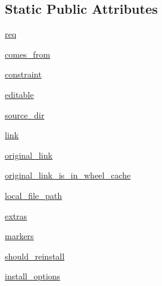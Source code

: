 \subsection*{Static Public Attributes}
\begin{DoxyCompactItemize}
\item 
\hyperlink{classpip_1_1__internal_1_1req_1_1req__install_1_1InstallRequirement_aaee69841707efebe8e49d5703b009d60}{req}
\item 
\hyperlink{classpip_1_1__internal_1_1req_1_1req__install_1_1InstallRequirement_a2f4681a19ef01f5d79b0c78f5efba577}{comes\+\_\+from}
\item 
\hyperlink{classpip_1_1__internal_1_1req_1_1req__install_1_1InstallRequirement_a283488228d8ee8f7bf9ef4f1269d71c2}{constraint}
\item 
\hyperlink{classpip_1_1__internal_1_1req_1_1req__install_1_1InstallRequirement_af54ea235448a85686c44afef87d655f5}{editable}
\item 
\hyperlink{classpip_1_1__internal_1_1req_1_1req__install_1_1InstallRequirement_ab4f0a9baf8f7626c0e143288c3beedf0}{source\+\_\+dir}
\item 
\hyperlink{classpip_1_1__internal_1_1req_1_1req__install_1_1InstallRequirement_a5a8e4ca3a4f956652eaf8520f37e0d30}{link}
\item 
\hyperlink{classpip_1_1__internal_1_1req_1_1req__install_1_1InstallRequirement_a481d31cb3e5b36c41dc402b6573e8e71}{original\+\_\+link}
\item 
\hyperlink{classpip_1_1__internal_1_1req_1_1req__install_1_1InstallRequirement_a9d2f7cc98eac3280e38d8e87dbb1d0cb}{original\+\_\+link\+\_\+is\+\_\+in\+\_\+wheel\+\_\+cache}
\item 
\hyperlink{classpip_1_1__internal_1_1req_1_1req__install_1_1InstallRequirement_aab616e73e88fc94f0435433edc2a5f7a}{local\+\_\+file\+\_\+path}
\item 
\hyperlink{classpip_1_1__internal_1_1req_1_1req__install_1_1InstallRequirement_ab1585bbb5f553842ff44717dbead7408}{extras}
\item 
\hyperlink{classpip_1_1__internal_1_1req_1_1req__install_1_1InstallRequirement_a97aa3af631824ff3e11d72ec549b6501}{markers}
\item 
\hyperlink{classpip_1_1__internal_1_1req_1_1req__install_1_1InstallRequirement_ae963869e3111a55c1b690c51d899c459}{should\+\_\+reinstall}
\item 
\hyperlink{classpip_1_1__internal_1_1req_1_1req__install_1_1InstallRequirement_ae5900d9e94bf65e3abc19e4fb2ba35e0}{install\+\_\+options}
\item 

\end{DoxyCompactItemize}
